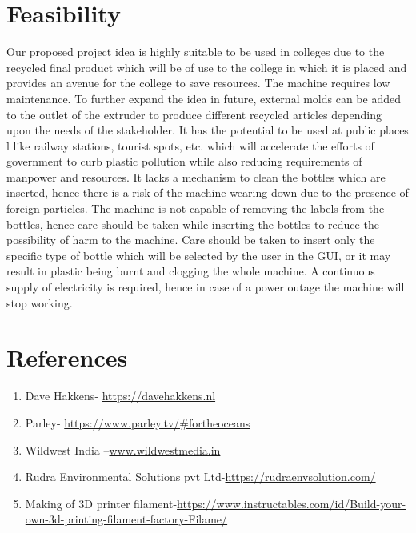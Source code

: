 \documentclass{article}
\begin{document}
\section{Feasibility}
\Large
Our proposed project idea is highly suitable to be used in colleges due to the recycled final product which will be of use to the college in which it is placed and provides an avenue for the college to save resources. The machine requires low maintenance. To further expand the idea in future, external molds can be added to the outlet of the extruder to produce different recycled articles depending upon the needs of the stakeholder. It has the potential to be used at public places l like railway stations, tourist spots, etc. which will accelerate the efforts of government to  curb plastic pollution while also reducing requirements of manpower and resources. It lacks a mechanism to clean the bottles which are inserted, hence there is a risk of the machine wearing down due to the presence of foreign particles. The machine is not capable of removing the labels from the bottles, hence care should be taken while inserting the bottles to reduce the possibility of harm to the machine. Care should be taken to insert only the specific type of bottle which will be selected by the user in the GUI, or it may result in plastic being burnt and clogging the whole machine. A continuous supply of electricity is required, hence in case of a power outage the machine will stop working.
\section{References}
\begin{enumerate}
   \item Dave Hakkens- \href{https://davehakkens.nl}{https://davehakkens.nl}   
\item Parley- \href{https://www.parley.tv/#fortheoceans}{https://www.parley.tv/#fortheoceans}
\item Wildwest India –\href{www.wildwestmedia.in}{www.wildwestmedia.in}
\item Rudra Environmental Solutions pvt Ltd-\href{https://rudraenvsolution.com/}{https://rudraenvsolution.com/}
\item Making of 3D printer filament-\href{https://www.instructables.com/id/Build-your-own-3d-printing-filament-factory-Filame/}{https://www.instructables.com/id/Build-your-own-3d-printing-filament-factory-Filame/}
\end{enumerate}
\end{document}
